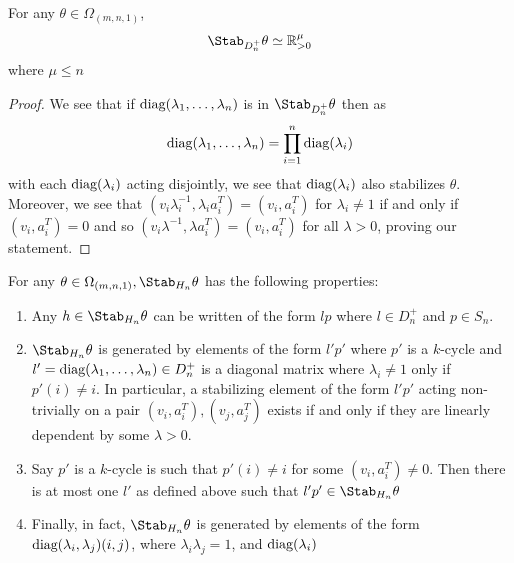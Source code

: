 \documentclass[11pt,letterpaper]{amsart}
\begin{document}
\begin{lemma}
    For any $\theta\in \Omega_{(m,n,1)}$, 
    $$
    \Stab_{D_n^+}\theta \simeq \mathbb{R}_{>0}^{\mu}
    $$
    where $\mu \leq n$
\end{lemma}
\begin{proof}
    We see that if $\textup{diag}(\lambda_1, \ldots, \lambda_n)$ is in $\Stab_{D_n^+}\theta$ then as 
    $$
    \textup{diag}(\lambda_1, \ldots, \lambda_n) = \prod_{i=1}^n \textup{diag}(\lambda_i)
    $$
    with each $\textup{diag}(\lambda_i)$ acting disjointly, we see that $\textup{diag}(\lambda_i)$ also stabilizes $\theta$. Moreover, we see that $(v_i\lambda_i^{-1}, \lambda_ia_i^T) = (v_i, a_i^T)$ for $\lambda_i\neq 1$ if and only if $(v_i, a_i^T)=0$ and so $(v_i\lambda^{-1}, \lambda a_i^T) = (v_i, a_i^T)$ for all $\lambda>0$, proving our statement.
\end{proof}
\begin{proposition}
    For any $\theta\in \Omega_{(m,n,1)}, \Stab_{H_n}\theta$ has the following properties:
    \begin{enumerate}
        \item Any $h\in\Stab_{H_n}\theta$ can be written of the form $lp$ where $l\in D_n^+$ and $p\in S_n$.
        \item $\Stab_{H_n}\theta$ is generated by elements of the form $l'p'$ where $p'$ is a $k$-cycle and $l' = \textup{diag}(\lambda_1, \ldots, \lambda_n)\in D_n^+$ is a diagonal matrix where $\lambda_i\neq 1$ only if $p'(i)\neq i$. In particular, a stabilizing element of the form $l'p'$ acting non-trivially on a pair $(v_i, a_i^T), (v_j, a_j^T)$ exists if and only if they are linearly dependent by some $\lambda>0$. 
        \item Say $p'$ is a $k$-cycle is such that $p'(i)\neq i$ for some $(v_i, a_i^T)\neq 0$. Then there is at most one $l'$ as defined above such that $l'p'\in \Stab_{H_n}\theta$
        \item Finally, in fact, $\Stab_{H_n}\theta$ is generated by elements of the form $\textup{diag}(\lambda_i, \lambda_j) (i, j)$, where $\lambda_i\lambda_j=1$, and $\textup{diag}(\lambda_i)$
    \end{enumerate}
\end{proposition}

\end{document}
